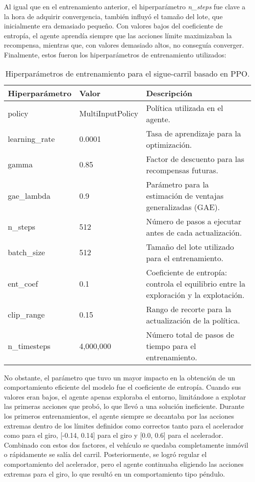 Al igual que en el entrenamiento anterior, el hiperparámetro \textit{n\_steps} fue clave a la hora de adquirir convergencia, también influyó el tamaño del lote, que inicialmente era demasiado pequeño. Con valores bajos del coeficiente de entropía, el agente aprendía siempre que las acciones límite maximizaban la recompensa, mientras que, con valores demasiado altos, no conseguía converger. Finalmente, estos fueron los hiperparámetros de entrenamiento utilizados:
\begin{table}[ht]
\centering
\begin{tabular}{|l|l|l|}
\hline
\textbf{Hiperparámetro} & \textbf{Valor} & \textbf{Descripción} \\ \hline
policy & MultiInputPolicy & Política utilizada en el agente. \\ \hline
learning\_rate & 0.0001 & Tasa de aprendizaje para la optimización. \\ \hline
gamma & 0.85 & Factor de descuento para las recompensas futuras. \\ \hline
gae\_lambda & 0.9 & Parámetro para la estimación de ventajas generalizadas (GAE). \\ \hline
n\_steps & 512 & Número de pasos a ejecutar antes de cada actualización. \\ \hline
batch\_size & 512 & Tamaño del lote utilizado para el entrenamiento. \\ \hline
ent\_coef & 0.1 & Coeficiente de entropía: controla el equilibrio entre la exploración y la explotación. \\ \hline
clip\_range & 0.15 & Rango de recorte para la actualización de la política. \\ \hline
n\_timesteps & 4,000,000 & Número total de pasos de tiempo para el entrenamiento. \\ \hline
\end{tabular}
\caption{Hiperparámetros de entrenamiento para el sigue-carril basado en \ac{PPO}.}
\label{tab:hiper_params_ppo}
\end{table}

\newpage

No obstante, el parámetro que tuvo un mayor impacto en la obtención de un comportamiento eficiente del modelo fue el coeficiente de entropía. Cuando sus valores eran bajos, el agente apenas exploraba el entorno, limitándose a explotar las primeras acciones que probó, lo que llevó a una solución ineficiente. Durante los primeros entrenamientos, el agente siempre se decantaba por las acciones extremas dentro de los límites definidos como correctos tanto para el acelerador como para el giro, [-0.14, 0.14] para el giro y [0.0, 0.6] para el acelerador. Combinado con estos dos factores, el vehículo se quedaba completamente inmóvil o rápidamente se salía del carril. Posteriormente, se logró regular el comportamiento del acelerador, pero el agente continuaba eligiendo las acciones extremas para el giro, lo que resultó en un comportamiento tipo péndulo. 

